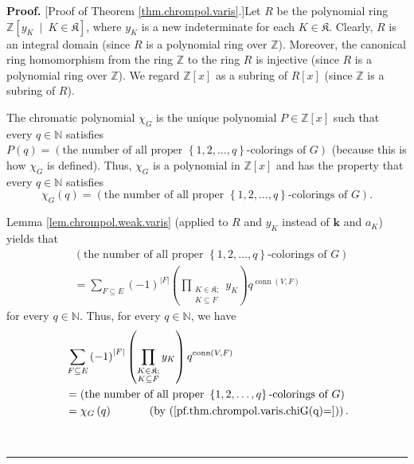 \documentclass[numbers=enddot,12pt,final,onecolumn,notitlepage]{scrartcl}%
\theoremstyle{definition}
\newenvironment{proof}[1][Proof]{\noindent\textbf{#1.} }{\ \rule{0.5em}{0.5em}}
\newenvironment{verlong}{}{}
\let\sumnonlimits\sum
\let\prodnonlimits\prod
\renewcommand{\sum}{\sumnonlimits\limits}
\renewcommand{\prod}{\prodnonlimits\limits}
\begin{document}
\begin{verlong}
\begin{proof}
[Proof of Theorem \ref{thm.chrompol.varis}.]Let $R$ be the polynomial ring
$\mathbb{Z}\left[  y_{K}\ \mid\ K\in\mathfrak{K}\right]  $, where $y_{K}$ is a
new indeterminate for each $K\in\mathfrak{K}$. Clearly, $R$ is an integral
domain (since $R$ is a polynomial ring over $\mathbb{Z}$). Moreover, the
canonical ring homomorphism from the ring $\mathbb{Z}$ to the ring $R$ is
injective (since $R$ is a polynomial ring over $\mathbb{Z}$). We regard
$\mathbb{Z}\left[  x\right]  $ as a subring of $R\left[  x\right]  $ (since
$\mathbb{Z}$ is a subring of $R$).

The chromatic polynomial $\chi_{G}$ is the unique polynomial $P\in
\mathbb{Z}\left[  x\right]  $ such that every $q\in\mathbb{N}$ satisfies
$P\left(  q\right)  =\left(  \text{the number of all proper }\left\{
1,2,\ldots,q\right\}  \text{-colorings of }G\right)  $ (because this is how
$\chi_{G}$ is defined). Thus, $\chi_{G}$ is a polynomial in $\mathbb{Z}\left[
x\right]  $ and has the property that every $q\in\mathbb{N}$ satisfies%
\begin{equation}
\chi_{G}\left(  q\right)  =\left(  \text{the number of all proper }\left\{
1,2,\ldots,q\right\}  \text{-colorings of }G\right)  .
\label{pf.thm.chrompol.varis.chiG(q)=}%
\end{equation}


Lemma \ref{lem.chrompol.weak.varis} (applied to $R$ and $y_{K}$ instead of
$\mathbf{k}$ and $a_{K}$) yields that%
\begin{align*}
&  \left(  \text{the number of all proper }\left\{  1,2,\ldots,q\right\}
\text{-colorings of }G\right) \\
&  =\sum_{F\subseteq E}\left(  -1\right)  ^{\left\vert F\right\vert }\left(
\prod_{\substack{K\in\mathfrak{K};\\K\subseteq F}}y_{K}\right)
q^{\operatorname*{conn}\left(  V,F\right)  }%
\end{align*}
for every $q\in\mathbb{N}$. Thus, for every $q\in\mathbb{N}$, we have%
\begin{align}
&  \sum_{F\subseteq E}\left(  -1\right)  ^{\left\vert F\right\vert }\left(
\prod_{\substack{K\in\mathfrak{K};\\K\subseteq F}}y_{K}\right)
q^{\operatorname*{conn}\left(  V,F\right)  }\nonumber\\
&  =\left(  \text{the number of all proper }\left\{  1,2,\ldots,q\right\}
\text{-colorings of }G\right) \nonumber\\
&  =\chi_{G}\left(  q\right)  \ \ \ \ \ \ \ \ \ \ \left(  \text{by
(\ref{pf.thm.chrompol.varis.chiG(q)=})}\right)  .
\label{pf.thm.chrompol.varis.2}%
\end{align}



\end{proof}
\end{verlong}
\end{document}
